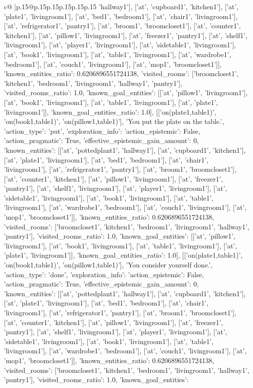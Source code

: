 \documentclass{article}
\begin{document}
{\begin{supertabular}{c@{$\;$}|p{.15\linewidth}@{}p{.15\linewidth}p{.15\linewidth}p{.15\linewidth}p{.15\linewidth}p{.15\linewidth}}
{{{'hallway1'], ['at', 'cupboard1', 'kitchen1'], ['at', 'plate1', 'livingroom1'], ['at', 'bed1', 'bedroom1'], ['at', 'chair1', 'livingroom1'], ['at', 'refrigerator1', 'pantry1'], ['at', 'broom1', 'broomcloset1'], ['at', 'counter1', 'kitchen1'], ['at', 'pillow1', 'livingroom1'], ['at', 'freezer1', 'pantry1'], ['at', 'shelf1', 'livingroom1'], ['at', 'player1', 'livingroom1'], ['at', 'sidetable1', 'livingroom1'], ['at', 'book1', 'livingroom1'], ['at', 'table1', 'livingroom1'], ['at', 'wardrobe1', 'bedroom1'], ['at', 'couch1', 'livingroom1'], ['at', 'mop1', 'broomcloset1']], 'known_entities_ratio': 0.6206896551724138, 'visited_rooms': ['broomcloset1', 'kitchen1', 'bedroom1', 'livingroom1', 'hallway1', 'pantry1'], 'visited_rooms_ratio': 1.0, 'known_goal_entities': [['at', 'pillow1', 'livingroom1'], ['at', 'book1', 'livingroom1'], ['at', 'table1', 'livingroom1'], ['at', 'plate1', 'livingroom1']], 'known_goal_entities_ratio': 1.0}}], [['on(plate1,table1)', 'on(book1,table1)', 'on(pillow1,table1)'], 'You put the plate on the table.', {'action_type': 'put', 'exploration_info': {'action_epistemic': False, 'action_pragmatic': True, 'effective_epistemic_gain_amount': 0, 'known_entities': [['at', 'pottedplant1', 'hallway1'], ['at', 'cupboard1', 'kitchen1'], ['at', 'plate1', 'livingroom1'], ['at', 'bed1', 'bedroom1'], ['at', 'chair1', 'livingroom1'], ['at', 'refrigerator1', 'pantry1'], ['at', 'broom1', 'broomcloset1'], ['at', 'counter1', 'kitchen1'], ['at', 'pillow1', 'livingroom1'], ['at', 'freezer1', 'pantry1'], ['at', 'shelf1', 'livingroom1'], ['at', 'player1', 'livingroom1'], ['at', 'sidetable1', 'livingroom1'], ['at', 'book1', 'livingroom1'], ['at', 'table1', 'livingroom1'], ['at', 'wardrobe1', 'bedroom1'], ['at', 'couch1', 'livingroom1'], ['at', 'mop1', 'broomcloset1']], 'known_entities_ratio': 0.6206896551724138, 'visited_rooms': ['broomcloset1', 'kitchen1', 'bedroom1', 'livingroom1', 'hallway1', 'pantry1'], 'visited_rooms_ratio': 1.0, 'known_goal_entities': [['at', 'pillow1', 'livingroom1'], ['at', 'book1', 'livingroom1'], ['at', 'table1', 'livingroom1'], ['at', 'plate1', 'livingroom1']], 'known_goal_entities_ratio': 1.0}}], [['on(plate1,table1)', 'on(book1,table1)', 'on(pillow1,table1)'], 'You consider yourself done.', {'action_type': 'done', 'exploration_info': {'action_epistemic': False, 'action_pragmatic': True, 'effective_epistemic_gain_amount': 0, 'known_entities': [['at', 'pottedplant1', 'hallway1'], ['at', 'cupboard1', 'kitchen1'], ['at', 'plate1', 'livingroom1'], ['at', 'bed1', 'bedroom1'], ['at', 'chair1', 'livingroom1'], ['at', 'refrigerator1', 'pantry1'], ['at', 'broom1', 'broomcloset1'], ['at', 'counter1', 'kitchen1'], ['at', 'pillow1', 'livingroom1'], ['at', 'freezer1', 'pantry1'], ['at', 'shelf1', 'livingroom1'], ['at', 'player1', 'livingroom1'], ['at', 'sidetable1', 'livingroom1'], ['at', 'book1', 'livingroom1'], ['at', 'table1', 'livingroom1'], ['at', 'wardrobe1', 'bedroom1'], ['at', 'couch1', 'livingroom1'], ['at', 'mop1', 'broomcloset1']], 'known_entities_ratio': 0.6206896551724138, 'visited_rooms': ['broomcloset1', 'kitchen1', 'bedroom1', 'livingroom1', 'hallway1', 'pantry1'], 'visited_rooms_ratio': 1.0, 'known_goal_entities': }}}
\end{supertabular}}
\end{document}
